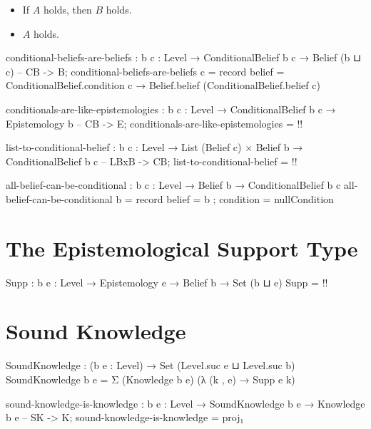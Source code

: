 \documentclass{article}
\begin{document}
\begin{itemize}
  \item If \(A\) holds, then \(B\) holds.
  \item \(A\) holds.
\end{itemize}

\begin{code}
conditional-beliefs-are-beliefs :
  {b c : Level} → ConditionalBelief b c → Belief (b ⊔ c) -- CB -> B;
conditional-beliefs-are-beliefs c = record
  { belief = ConditionalBelief.condition c → Belief.belief (ConditionalBelief.belief c)
  }
\end{code}

\begin{code}
conditionals-are-like-epistemologies :
  {b c : Level} → ConditionalBelief b c → Epistemology b -- CB -> E;
conditionals-are-like-epistemologies = {!!}
\end{code}

\begin{code}
list-to-conditional-belief :
  {b c : Level} →
  List (Belief c) × Belief b →
  ConditionalBelief b c -- LBxB -> CB;
list-to-conditional-belief = {!!}
\end{code}

\begin{code}
all-belief-can-be-conditional : {b c : Level} → Belief b → ConditionalBelief b c
all-belief-can-be-conditional b = record
  { belief = b
  ; condition = nullCondition
  }
\end{code}

\section{The Epistemological Support Type}

\begin{code}
Supp : {b e : Level} → Epistemology e → Belief b → Set (b ⊔ e)
Supp = {!!}
\end{code}

\section{Sound Knowledge}\label{sec:soundKnowledge}

\begin{code}
SoundKnowledge : (b e : Level) → Set (Level.suc e ⊔ Level.suc b)
SoundKnowledge b e = Σ (Knowledge b e) (λ (k , e) → Supp e k)
\end{code}

\begin{code}
sound-knowledge-is-knowledge :
  {b e : Level} → SoundKnowledge b e → Knowledge b e -- SK -> K;
sound-knowledge-is-knowledge = proj₁
\end{code}
\end{document}

